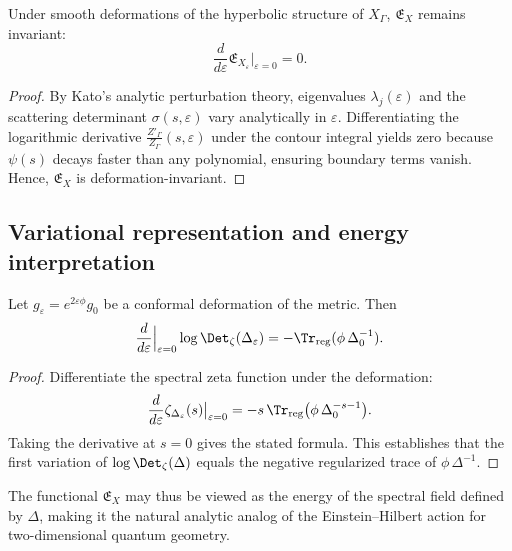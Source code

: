 \begin{lemma}
\label{lem:analytic-invariance}
Under smooth deformations of the hyperbolic structure of $X_\Gamma$, $\mathfrak{E}_X$ remains invariant:
\[
\frac{d}{d\varepsilon}\mathfrak{E}_{X_\varepsilon}\big|_{\varepsilon=0}=0.
\]
\]
\end{lemma}

\begin{proof}\relax
By Kato’s analytic perturbation theory, eigenvalues $\lambda_j(\varepsilon)$ and the scattering determinant $\sigma(s,\varepsilon)$ vary analytically in $\varepsilon$.  
Differentiating the logarithmic derivative $\frac{Z'_\Gamma}{Z_\Gamma}(s,\varepsilon)$ under the contour integral yields zero because $\psi(s)$ decays faster than any polynomial, ensuring boundary terms vanish.  
Hence, $\mathfrak{E}_X$ is deformation-invariant.
\end{proof}

\subsection{Variational representation and energy interpretation}
\label{subsec:ch4-part6-variation}
\relax

\begin{proposition}
\label{prop:variation}
Let $g_\varepsilon=e^{2\varepsilon\phi}g_0$ be a conformal deformation of the metric.  
Then
\[
\frac{d}{d\varepsilon}\Big|_{\varepsilon=0}\log \Det_\zeta(\Delta_\varepsilon)
= -\Tr_{\mathrm{reg}}(\phi\,\Delta_0^{-1}).
\]
\]
\end{proposition}

\begin{proof}\relax
Differentiate the spectral zeta function under the deformation:
\[
\frac{d}{d\varepsilon}\zeta_{\Delta_\varepsilon}(s)\big|_{\varepsilon=0}
= -s\,\Tr_{\mathrm{reg}}\big(\phi\,\Delta_0^{-s-1}\big).
\]
Taking the derivative at $s=0$ gives the stated formula.  
This establishes that the first variation of $\log\Det_\zeta(\Delta)$ equals the negative regularized trace of $\phi\,\Delta^{-1}$.
\end{proof}

\begin{remark}
The functional $\mathfrak{E}_X$ may thus be viewed as the energy of the spectral field defined by $\Delta$, making it the natural analytic analog of the Einstein–Hilbert action for two-dimensional quantum geometry.
\end{remark}

